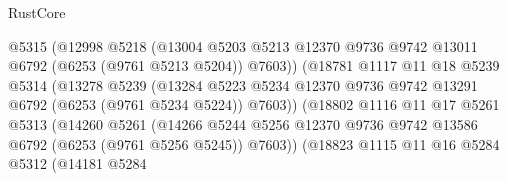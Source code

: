 \begin{lexlean}{RustCore}
\begin{coremodule}
                                  @5315
                                  (@12998
                                    @5218
                                    (@13004
                                      @5203
                                      @5213
                                      @12370
                                      @9736
                                      @9742
                                      @13011
                                      @6792
                                      (@6253 (@9761 @5213 @5204))
                                      @7603))
                                  (@18781
                                    @1117
                                    @11
                                    @18
                                    @5239
                                    @5314
                                    (@13278
                                      @5239
                                      (@13284
                                        @5223
                                        @5234
                                        @12370
                                        @9736
                                        @9742
                                        @13291
                                        @6792
                                        (@6253 (@9761 @5234 @5224))
                                        @7603))
                                    (@18802
                                      @1116
                                      @11
                                      @17
                                      @5261
                                      @5313
                                      (@14260
                                        @5261
                                        (@14266
                                          @5244
                                          @5256
                                          @12370
                                          @9736
                                          @9742
                                          @13586
                                          @6792
                                          (@6253 (@9761 @5256 @5245))
                                          @7603))
                                      (@18823
                                        @1115
                                        @11
                                        @16
                                        @5284
                                        @5312
                                        (@14181
                                          @5284

\end{coremodule}
\end{lexlean}
